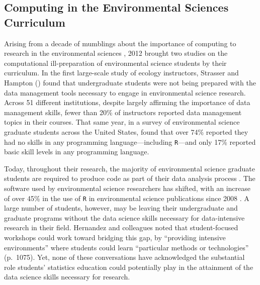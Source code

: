 \documentclass[12pt]{article}
\begin{document}
\subsection{Computing in the Environmental Sciences Curriculum}

\quad Arising from a decade of mumblings about the importance of computing to 
research in the environmental sciences \citep{andelman, dodds1, dodds2, eglen, 
green, hastings, kelling, wilson-software-carpentry, wilson, wing}, 2012 brought
two studies on the computational ill-preparation of environmental science 
students by their curriculum. In the first large-scale study of ecology
instructors, Strasser and Hampton (\citeyear{labs}) found that undergraduate
students were not being prepared with the data management tools necessary to
engage in environmental science research. Across 51 different institutions,
despite largely affirming the importance of data management skills, fewer than
20\% of instructors reported data management topics in their courses. That same
year, in a survey of environmental science graduate students across the United
States, \citet{hernandez} found that over 74\% reported they had no skills in
any programming language---including \texttt{R}---and only 17\% reported basic
skill levels in any programming language. 

\quad Today, throughout their research, the majority of 
environmental science graduate students are required to produce code as part of
their data analysis process \citep{mislan}. The software used by
environmental science researchers has shifted, with an increase of over 45\%
in the use of \texttt{R} in environmental science publications since 2008
\citep{Rpopular}. A large number of students, however,
may be leaving their undergraduate and graduate programs without the
data science skills necessary for data-intensive research in their field.
Hernandez and colleagues noted that student-focused workshops could
work toward bridging this gap, by ``providing intensive environments'' where
students could learn ``particular methods or technologies'' (p.\ 1075).
Yet, none of these conversations have acknowledged the substantial role
students' statistics education could potentially play in the attainment of the
data science skills necessary for research.

\end{document}
